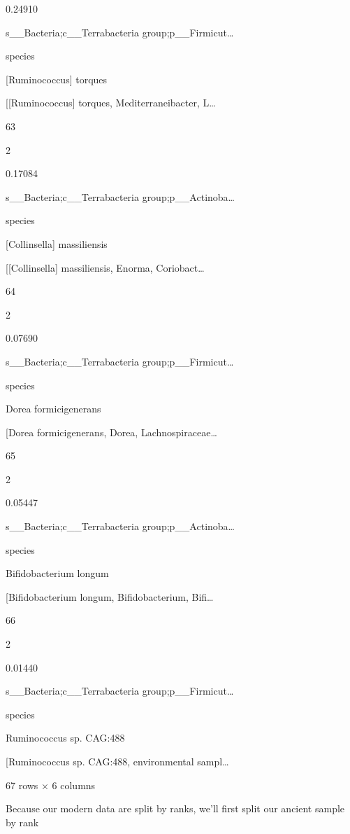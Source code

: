 \documentclass[
  letterpaper,
]{book}
\begin{document}
0.24910

s\_\_Bacteria;c\_\_Terrabacteria group;p\_\_Firmicut\ldots{}

species

{[}Ruminococcus{]} torques

{[}{[}Ruminococcus{]} torques, Mediterraneibacter, L\ldots{}

63

2

0.17084

s\_\_Bacteria;c\_\_Terrabacteria group;p\_\_Actinoba\ldots{}

species

{[}Collinsella{]} massiliensis

{[}{[}Collinsella{]} massiliensis, Enorma, Coriobact\ldots{}

64

2

0.07690

s\_\_Bacteria;c\_\_Terrabacteria group;p\_\_Firmicut\ldots{}

species

Dorea formicigenerans

{[}Dorea formicigenerans, Dorea, Lachnospiraceae\ldots{}

65

2

0.05447

s\_\_Bacteria;c\_\_Terrabacteria group;p\_\_Actinoba\ldots{}

species

Bifidobacterium longum

{[}Bifidobacterium longum, Bifidobacterium, Bifi\ldots{}

66

2

0.01440

s\_\_Bacteria;c\_\_Terrabacteria group;p\_\_Firmicut\ldots{}

species

Ruminococcus sp. CAG:488

{[}Ruminococcus sp. CAG:488, environmental sampl\ldots{}

67 rows × 6 columns

Because our modern data are split by ranks, we'll first split our
ancient sample by rank
\end{document}
